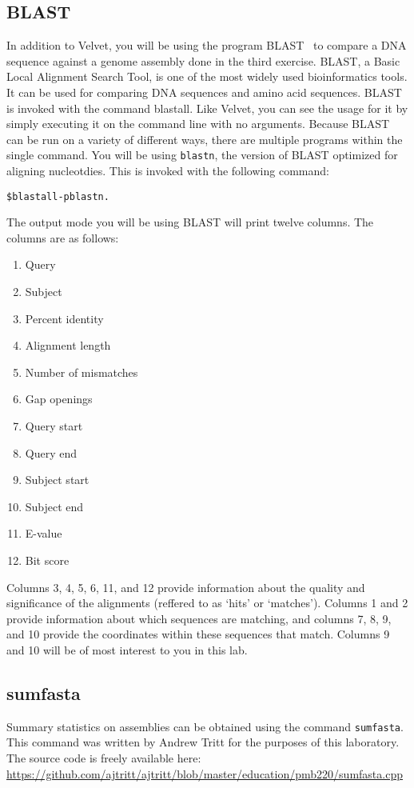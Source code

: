 \documentclass[11pt,a4paper]{scrartcl}
\begin{document}
\subsection*{BLAST}
In addition to Velvet, you will be using the program BLAST~\cite{blast} to compare a DNA
sequence against a genome assembly done in the third exercise. BLAST, a Basic
Local Alignment Search Tool, is one of the most widely used bioinformatics
tools. It can be used for comparing DNA sequences and amino acid sequences.
BLAST is invoked with the command blastall. Like Velvet, you can see the usage
for it by simply executing it on the command line with no arguments. Because
BLAST can be run on a variety of different ways, there are multiple programs
within the single command. You will be using \texttt{blastn}, the version of BLAST
optimized for aligning nucleotdies. This is invoked with the following command:
\begin{alltt}
    \$ blastall -p blastn. 
\end{alltt}
The output mode you will be using BLAST will print twelve columns. The columns
are as follows:
\begin{multicols}{3}
\begin{enumerate}
    \item Query
    \item Subject
    \item Percent identity
    \item Alignment length
    \item Number of mismatches
    \item Gap openings
    \item Query start
    \item Query end
    \item Subject start
    \item Subject end
    \item E-value
    \item Bit score
\end{enumerate}
\end{multicols}
Columns 3, 4, 5, 6, 11, and 12 provide information about the quality and
significance of the alignments (reffered to as `hits' or `matches'). Columns 1
and 2 provide information about which sequences are matching, and columns 7, 8,
9, and 10 provide the coordinates within these sequences that match. Columns 9
and 10 will be of most interest to you in this lab.

\subsection*{sumfasta}
Summary statistics on assemblies can be obtained using the command \texttt{sumfasta}. This
command was written by Andrew Tritt for the purposes of this laboratory. The source
code is freely available here: \url{https://github.com/ajtritt/ajtritt/blob/master/education/pmb220/sumfasta.cpp}
\end{document}

